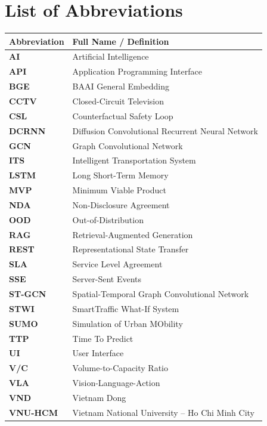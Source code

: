 \chapter*{List of Abbreviations}

\begin{longtable}{|p{3.5cm}|p{11.5cm}|}
\hline
\rowcolor{blue!10}
\textbf{Abbreviation} & \textbf{Full Name / Definition} \\
\hline
\endhead

\textbf{AI} & Artificial Intelligence \\
\hline
\textbf{API} & Application Programming Interface \\
\hline
\textbf{BGE} & BAAI General Embedding \\
\hline
\textbf{CCTV} & Closed-Circuit Television \\
\hline
\textbf{CSL} & Counterfactual Safety Loop \\
\hline
\textbf{DCRNN} & Diffusion Convolutional Recurrent Neural Network \\
\hline
\textbf{GCN} & Graph Convolutional Network \\
\hline
\textbf{ITS} & Intelligent Transportation System \\
\hline
\textbf{LSTM} & Long Short-Term Memory \\
\hline
\textbf{MVP} & Minimum Viable Product \\
\hline
\textbf{NDA} & Non-Disclosure Agreement \\
\hline
\textbf{OOD} & Out-of-Distribution \\
\hline
\textbf{RAG} & Retrieval-Augmented Generation \\
\hline
\textbf{REST} & Representational State Transfer \\
\hline
\textbf{SLA} & Service Level Agreement \\
\hline
\textbf{SSE} & Server-Sent Events \\
\hline
\textbf{ST-GCN} & Spatial-Temporal Graph Convolutional Network \\
\hline
\textbf{STWI} & SmartTraffic What-If System \\
\hline
\textbf{SUMO} & Simulation of Urban MObility \\
\hline
\textbf{TTP} & Time To Predict \\
\hline
\textbf{UI} & User Interface \\
\hline
\textbf{V/C} & Volume-to-Capacity Ratio \\
\hline
\textbf{VLA} & Vision-Language-Action \\
\hline
\textbf{VND} & Vietnam Dong \\
\hline
\textbf{VNU-HCM} & Vietnam National University -- Ho Chi Minh City \\
\hline
\end{longtable}
